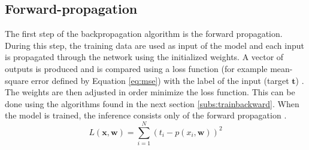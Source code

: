 \subsection{Forward-propagation} \label{subs:trainforward}
%
The first step of the backpropagation algorithm is the forward propagation. During this step, the training data are used as input of the model and each input is propagated through the network using the initialized weights. A vector of outputs is produced and is compared using a loss function (for example mean-square error defined by Equation \eqref{eq:mse}) with the label of the input (target $\boldsymbol{t}$) \cite{matteucci_artificial_2019}. The weights are then adjusted in order minimize the loss function. This can be done using the algorithms found in the next section \ref{subs:trainbackward}. When the model is trained, the inference consists only of the forward propagation \cite{abdelouahab_accelerating_2018}. 
%
\begin{equation}
    L(\boldsymbol{x}, \boldsymbol{w}) = \sum^{N}_{i=1} (t_i - p(x_i, \boldsymbol{w}))^2
    \label{eq:mse}
\end{equation}
